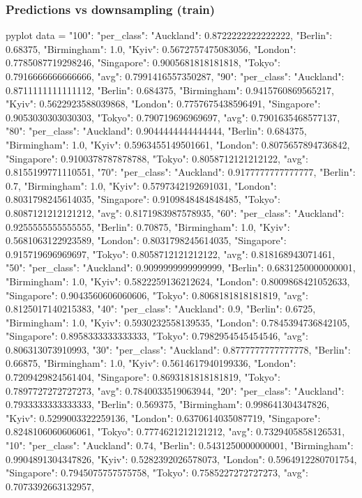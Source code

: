 \begin{frame}[fragile]
  \frametitle{Predictions vs downsampling (train)}

  \begin{CacheMeCode}{pyplot}
    data = {
      "100": {"per_class": {"Auckland": 0.8722222222222222, "Berlin": 0.68375, "Birmingham": 1.0, "Kyiv": 0.5672757475083056, "London": 0.7785087719298246, "Singapore": 0.9005681818181818, "Tokyo": 0.7916666666666666}, "avg": 0.7991416557350287},
      "90": {"per_class": {"Auckland": 0.8711111111111112, "Berlin": 0.684375, "Birmingham": 0.9415760869565217, "Kyiv": 0.5622923588039868, "London": 0.7757675438596491, "Singapore": 0.9053030303030303, "Tokyo": 0.790719696969697}, "avg": 0.7901635468577137},
      "80": {"per_class": {"Auckland": 0.9044444444444444, "Berlin": 0.684375, "Birmingham": 1.0, "Kyiv": 0.5963455149501661, "London": 0.8075657894736842, "Singapore": 0.9100378787878788, "Tokyo": 0.8058712121212122}, "avg": 0.8155199771110551},
      "70": {"per_class": {"Auckland": 0.9177777777777777, "Berlin": 0.7, "Birmingham": 1.0, "Kyiv": 0.5797342192691031, "London": 0.8031798245614035, "Singapore": 0.9109848484848485, "Tokyo": 0.8087121212121212}, "avg": 0.8171983987578935},
      "60": {"per_class": {"Auckland": 0.9255555555555555, "Berlin": 0.70875, "Birmingham": 1.0, "Kyiv": 0.5681063122923589, "London": 0.8031798245614035, "Singapore": 0.915719696969697, "Tokyo": 0.8058712121212122}, "avg": 0.818168943071461},
      "50": {"per_class": {"Auckland": 0.9099999999999999, "Berlin": 0.6831250000000001, "Birmingham": 1.0, "Kyiv": 0.5822259136212624, "London": 0.8009868421052633, "Singapore": 0.9043560606060606, "Tokyo": 0.8068181818181819}, "avg": 0.8125017140215383},
      "40": {"per_class": {"Auckland": 0.9, "Berlin": 0.6725, "Birmingham": 1.0, "Kyiv": 0.5930232558139535, "London": 0.7845394736842105, "Singapore": 0.8958333333333333, "Tokyo": 0.7982954545454546}, "avg": 0.806313073910993},
      "30": {"per_class": {"Auckland": 0.8777777777777778, "Berlin": 0.66875, "Birmingham": 1.0, "Kyiv": 0.5614617940199336, "London": 0.7209429824561404, "Singapore": 0.8693181818181819, "Tokyo": 0.7897727272727273}, "avg": 0.7840033519063944},
      "20": {"per_class": {"Auckland": 0.7933333333333333, "Berlin": 0.569375, "Birmingham": 0.998641304347826, "Kyiv": 0.5299003322259136, "London": 0.6370614035087719, "Singapore": 0.8248106060606061, "Tokyo": 0.7774621212121212}, "avg": 0.7329405858126531},
      "10": {"per_class": {"Auckland": 0.74, "Berlin": 0.5431250000000001, "Birmingham": 0.9904891304347826, "Kyiv": 0.5282392026578073, "London": 0.5964912280701754, "Singapore": 0.7945075757575758, "Tokyo": 0.7585227272727273}, "avg": 0.7073392663132957},
    }


\end{CacheMeCode}
\end{frame}
